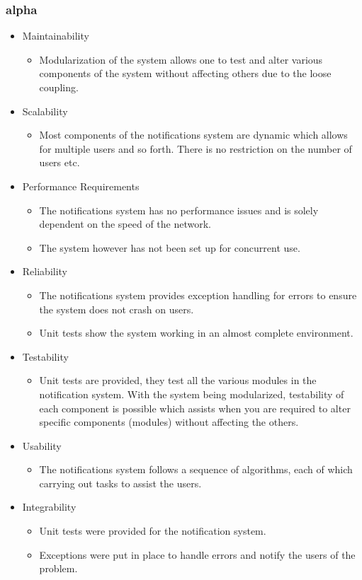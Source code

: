 \subsubsection{alpha}
\begin{itemize}
	\item Maintainability
		\begin{itemize}
			\item Modularization of the system allows one to test and alter various components of the system without affecting others due to the loose coupling.
		\end{itemize}
	\item Scalability
	\begin{itemize}
		\item Most components of the notifications system are dynamic which allows for multiple users and so forth. There is no restriction on the number of users etc. 
	\end{itemize}
	\item Performance Requirements
	\begin{itemize}
		\item The notifications system has no performance issues and is solely dependent on the speed of the network.
		\item The system however has not been set up for concurrent use.
	\end{itemize}
	\item Reliability
	\begin{itemize}
		\item The notifications system provides exception handling for errors to ensure the system does not crash on users.
		\item Unit tests show the system working in an almost complete environment.
	\end{itemize}	
	\item Testability
	\begin{itemize}
		\item Unit tests are provided, they test all the various modules in the notification system. With the system being modularized, testability of each component is possible which assists when you are required to alter specific components (modules) without affecting the others.
	\end{itemize}
	\item Usability
	\begin{itemize}
		\item The notifications system follows a sequence of algorithms, each of which carrying out tasks to assist the users.
	\end{itemize}
	\item Integrability
	\begin{itemize}
		\item Unit tests were provided for the notification system.
		\item Exceptions were put in place to handle errors and notify the users of the problem.
	\end{itemize}
\end{itemize}